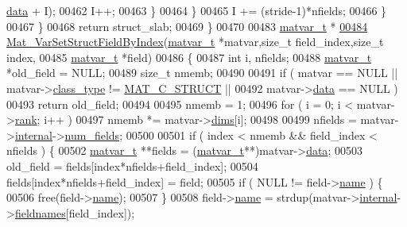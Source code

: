 \begin{DoxyCode}
      \hyperlink{group___m_a_t_a5672978efa230bbdecdf38ede781f7fa}{data} + I);
00462                     I++;
00463                 \}
00464             \}
00465             I += (stride-1)*nfields;
00466         \}
00467     \}
00468     \textcolor{keywordflow}{return} struct\_slab;
00469 \}
00470 
00483 \hyperlink{group___m_a_t_structmatvar__t}{matvar\_t} *
\hyperlink{group___m_a_t_ga3f077a005a8521c7a78927c1a1b4ae45}{00484} \hyperlink{group___m_a_t_ga3f077a005a8521c7a78927c1a1b4ae45}{Mat\_VarSetStructFieldByIndex}(\hyperlink{group___m_a_t_structmatvar__t}{matvar\_t} *matvar,\textcolor{keywordtype}{size\_t} field\_index,\textcolor{keywordtype}{size\_t}
       index,
00485     \hyperlink{group___m_a_t_structmatvar__t}{matvar\_t} *field)
00486 \{
00487     \textcolor{keywordtype}{int}       i, nfields;
00488     \hyperlink{group___m_a_t_structmatvar__t}{matvar\_t} *old\_field = NULL;
00489     \textcolor{keywordtype}{size\_t} nmemb;
00490 
00491     \textcolor{keywordflow}{if} ( matvar == NULL || matvar->\hyperlink{group___m_a_t_aff13035bf3265dd7d9425e5d40c839d4}{class\_type} != \hyperlink{group___m_a_t_ggad4d60ae7b709fc81bfd744fb4c857c40acb467c7749c80902b798134c729bb521}{MAT\_C\_STRUCT} ||
00492         matvar->\hyperlink{group___m_a_t_a5672978efa230bbdecdf38ede781f7fa}{data} == NULL )
00493         \textcolor{keywordflow}{return} old\_field;
00494 
00495     nmemb = 1;
00496     \textcolor{keywordflow}{for} ( i = 0; i < matvar->\hyperlink{group___m_a_t_a84ba70c96ded13cc555fa75b768d9921}{rank}; i++ )
00497         nmemb *= matvar->\hyperlink{group___m_a_t_a8e01234e1c862ce3472bb37f5a09b92c}{dims}[i];
00498 
00499     nfields = matvar->\hyperlink{group___m_a_t_a6e97e3ed9f40c49322c18561c2a94e92}{internal}->\hyperlink{structmatvar__internal_a93fc447484f455eddf9334f2e9e411c2}{num\_fields};
00500 
00501     if ( index < nmemb && field\_index < nfields ) \{
00502         \hyperlink{group___m_a_t_structmatvar__t}{matvar\_t} **fields = (\hyperlink{group___m_a_t_structmatvar__t}{matvar\_t}**)matvar->\hyperlink{group___m_a_t_a5672978efa230bbdecdf38ede781f7fa}{data};
00503         old\_field = fields[index*nfields+field\_index];
00504         fields[index*nfields+field\_index] = field;
00505         if ( NULL != field->\hyperlink{group___m_a_t_a5d4b55b041e3b4fb50c04337f05ad909}{name} ) \{
00506             free(field->\hyperlink{group___m_a_t_a5d4b55b041e3b4fb50c04337f05ad909}{name});
00507         \}
00508         field->\hyperlink{group___m_a_t_a5d4b55b041e3b4fb50c04337f05ad909}{name} = strdup(matvar->\hyperlink{group___m_a_t_a6e97e3ed9f40c49322c18561c2a94e92}{internal}->\hyperlink{structmatvar__internal_a7574d000bfc98ad4860ae6590b8d4985}{fieldnames}[field\_index]);

\end{DoxyCode}

